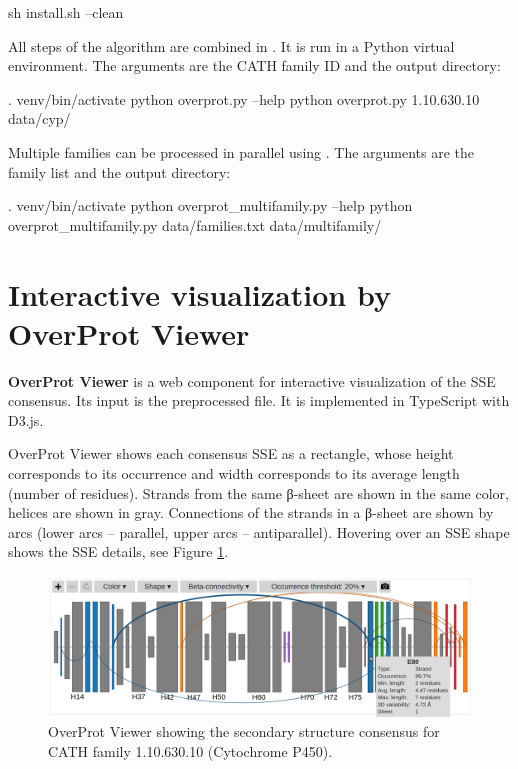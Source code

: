 \documentclass{article}
\begin{document}
\begin{codeblock}
  sh install.sh --clean
\end{codeblock}

All steps of the algorithm are combined in . 
It is run in a Python virtual environment. 
The arguments are the CATH family ID and the output directory:

\begin{codeblock}
  . venv/bin/activate
  python overprot.py --help
  python overprot.py 1.10.630.10 data/cyp/
\end{codeblock}

Multiple families can be processed in parallel using . 
The arguments are the family list and the output directory:

\begin{codeblock}
  . venv/bin/activate
  python overprot_multifamily.py --help
  python overprot_multifamily.py data/families.txt data/multifamily/
\end{codeblock}


\section{Interactive visualization by OverProt Viewer}

\textbf{OverProt Viewer} is a web component for interactive
visualization of the SSE consensus. Its input is the preprocessed
 file. It is implemented in TypeScript with D3.js.

OverProt Viewer shows each consensus SSE as a rectangle, whose height 
corresponds to its occurrence 
and width corresponds to its average length (number of residues). 
Strands from the same β-sheet are shown in the same color, helices are shown in gray. 
Connections of the strands in a β-sheet are shown by arcs 
(lower arcs -- parallel, upper arcs -- antiparallel). 
Hovering over an SSE shape shows the SSE details, see Figure \ref{fig:overprot_viewer}.

\begin{figure}[h!]
  \centering\includegraphics[width=\linewidth]{figures/overprot_viewer.png}
  \caption{OverProt Viewer showing the secondary structure consensus for CATH family 1.10.630.10 (Cytochrome P450).}
  \label{fig:overprot_viewer}
\end{figure}
\end{document}
